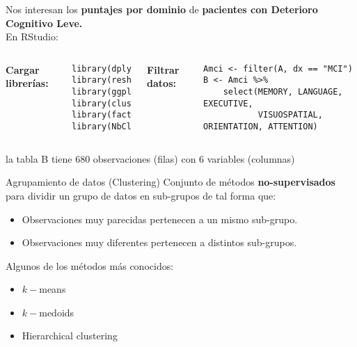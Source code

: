 \documentclass[10pt, aspectratio=169]{beamer}
\begin{document}
\begin{frame}[fragile]{}
 Nos interesan los \textbf{puntajes por dominio} de \textbf{pacientes con Deterioro Cognitivo Leve.}\\
 \vspace{0.4cm}
 \pause
 En RStudio:\\
 \vspace{0.3cm}
 \begin{columns}[t]
 \pause
 \textcolor{UltraViolet}{\textbf{Cargar librerías:}}\\
 \vspace{-0.2cm}
 \begin{verbatim}
library(dplyr)
library(reshape2)
library(ggplot2)
library(cluster)
library(factoextra)
library(NbClust)
 \end{verbatim}
 \pause
 \textcolor{UltraViolet}{\textbf{Filtrar datos:}}\\
 \vspace{-0.2cm}
 \begin{verbatim}
Amci <- filter(A, dx == "MCI")
B <- Amci %>%
    select(MEMORY, LANGUAGE, EXECUTIVE, 
           VISUOSPATIAL, ORIENTATION, ATTENTION)
 \end{verbatim}
 \end{columns}
 la tabla B tiene 680 observaciones (filas) con 6 variables (columnas)
\end{frame}

\begin{frame}[fragile]{Agrupamiento de datos (Clustering)}
Conjunto de métodos \textbf{no-supervisados} para dividir un grupo de datos en sub-grupos de tal forma que:
\begin{itemize}
 \item Observaciones muy parecidas pertenecen a un mismo sub-grupo.
 \item Observaciones muy diferentes pertenecen a distintos sub-grupos.
\end{itemize}
\vspace{0.4cm}
\pause
Algunos de los métodos más conocidos:
 \begin{itemize}
  \item \textcolor<3>{PinkPeacock}{$k-$means} 
  \item $k-$medoids
  \item Hierarchical clustering
 \end{itemize}
\end{frame}
\end{document}
